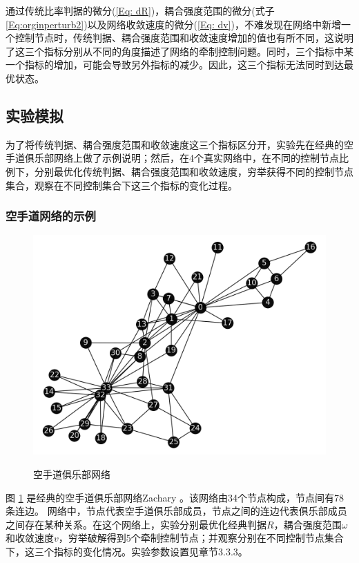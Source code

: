 通过传统比率判据的微分(\ref{Eq: dR})，耦合强度范围的微分(式子\ref{Eq:orginperturb2})以及网络收敛速度的微分(\ref{Eq: dv})，不难发现在网络中新增一个控制节点时，传统判据、耦合强度范围和收敛速度增加的值也有所不同，这说明了这三个指标分别从不同的角度描述了网络的牵制控制问题。同时，三个指标中某一个指标的增加，可能会导致另外指标的减少。因此，这三个指标无法同时到达最优状态。

\subsection{实验模拟}
为了将传统判据、耦合强度范围和收敛速度这三个指标区分开，实验先在经典的空手道俱乐部网络上做了示例说明；然后，在4个真实网络中，在不同的控制节点比例下，分别最优化传统判据、耦合强度范围和收敛速度，穷举获得不同的控制节点集合，观察在不同控制集合下这三个指标的变化过程。

\subsubsection{空手道网络的示例}

\begin{figure}[ht]%
	\centering
	\includegraphics[width=0.6\columnwidth]{chapter3Fig/exm.png}\\
	\caption{空手道俱乐部网络}
	\label{Fig： karate}	
\end{figure}

图 \ref{Fig： karate} 是经典的空手道俱乐部网络Zachary  \cite{Zachary1977} 。该网络由34个节点构成，节点间有78条连边。
网络中，节点代表空手道俱乐部成员，节点之间的连边代表俱乐部成员之间存在某种关系。在这个网络上，实验分别最优化经典判据$ R $，耦合强度范围$ \omega $和收敛速度$ v $，穷举破解得到5个牵制控制节点；并观察分别在不同控制节点集合下，这三个指标的变化情况。实验参数设置见章节$ 3.3.3 $。

\begin{table}[h]
\end{table}

